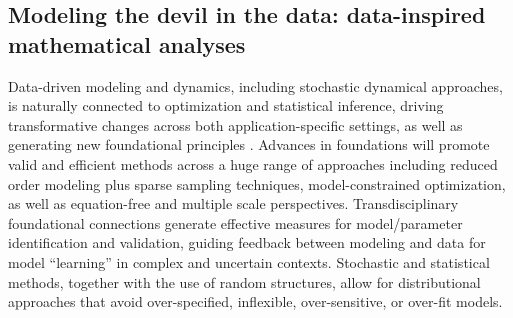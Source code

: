 \documentclass[12pt]{article}
\begin{document}

\vspace*{-1em}
\subsection{Modeling the devil in the data: data-inspired mathematical analyses}
\label{sec:multi-modal}

Data-driven modeling and dynamics, including stochastic dynamical approaches, is naturally connected to optimization and statistical inference, driving transformative changes across  both  application-specific settings, as well as generating new foundational principles \cite{brunton2016discovering, michopoulos2003design, peherstorfer2015online, kang2015path}.
Advances in foundations will promote valid and efficient methods across a huge range of approaches including  reduced order modeling plus sparse sampling techniques, model-constrained optimization, as well as equation-free and multiple scale perspectives.
Transdisciplinary foundational connections generate effective measures for model/parameter identification and validation, guiding feedback between modeling and data for  model ``learning'' in complex
and uncertain contexts.
Stochastic and statistical methods, together with the use of random structures, allow for distributional approaches that avoid over-specified, inflexible,  over-sensitive, or over-fit models.  %
\end{document}
